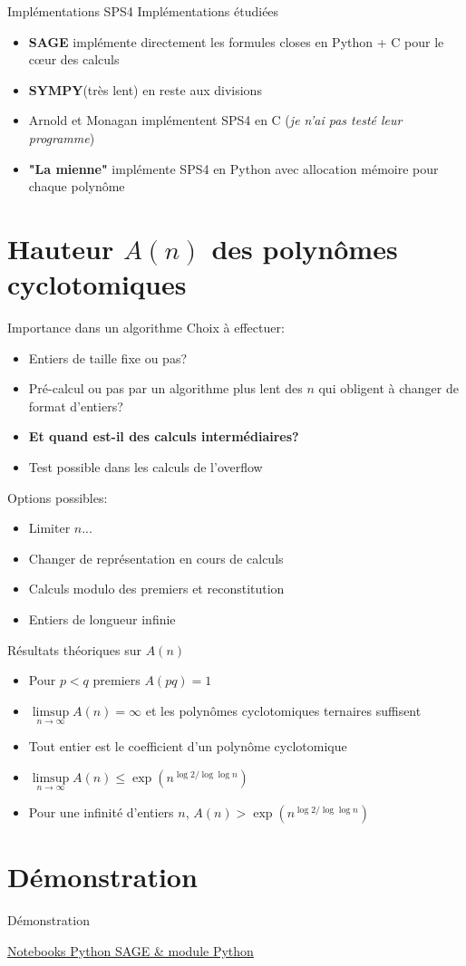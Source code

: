 \documentclass{beamer}
\begin{document}
	\begin{frame}{Implémentations SPS4}
		Implémentations étudiées
		\begin{itemize}
			\item 
			\textbf{SAGE} implémente directement les formules closes en Python + C pour le cœur des calculs
			\item \textbf{SYMPY}(très lent) en reste aux divisions
			\item Arnold et Monagan implémentent SPS4 en C (\textit{je n'ai pas testé leur programme})
			\item \textbf{"La mienne"} implémente SPS4 en Python avec allocation mémoire pour chaque polynôme
		\end{itemize}
	\end{frame}

	\section{Hauteur $A(n)$ des polynômes cyclotomiques}
	
	\begin{frame}{Importance dans un algorithme}
		Choix à effectuer:
		\begin{itemize}
			\item Entiers de taille fixe ou pas?
			\item Pré-calcul ou pas par un algorithme plus lent des $n$ qui obligent à changer de format d'entiers?
			\item \textbf{Et quand est-il des calculs intermédiaires?}
			\item Test possible dans les calculs de l'overflow
		\end{itemize}
		Options possibles:
		\begin{itemize}
			\item Limiter $n$...
			\item Changer de représentation en cours de calculs
			\item Calculs modulo des premiers et reconstitution
			\item Entiers de longueur infinie
		\end{itemize}
	\end{frame}

	\begin{frame}{Résultats théoriques sur $A(n)$}
		\begin{itemize}
			\item Pour $p < q$ premiers $A(pq) = 1$
			\item $\limsup\limits_{n \to \infty} A(n) = \infty$ et les polynômes cyclotomiques ternaires suffisent
			\item Tout entier est le coefficient d'un polynôme cyclotomique
			\item $\limsup\limits_{n \to \infty} A(n) \le \exp(n^{\log 2 / \log \log n})$
			\item Pour une infinité d'entiers $n$, $A(n) > \exp(n^{\log 2 / \log \log n})$
		\end{itemize}		
	\end{frame}
		
	
	\section{Démonstration}
	\begin{frame}{Démonstration}
		
		\href{https://jupyter.math.sorbonne-universite.fr/user/21304439/lab}{Notebooks Python SAGE \& module Python}
		
	\end{frame}
	
\end{document}
